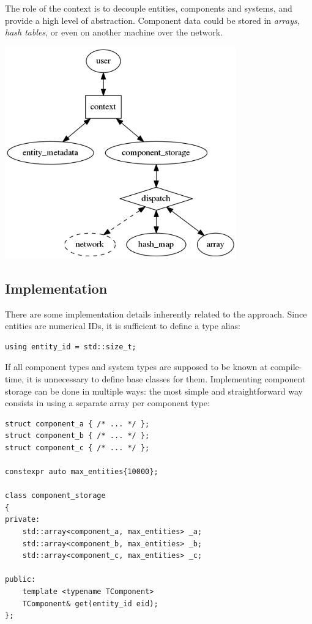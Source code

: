 \documentclass[oneside, 12pt, a4paper, openany]{book}
\let\origfigure=\figure
\let\endorigfigure=\endfigure
\renewenvironment{figure}[1][]{%
\origfigure[H]
}{%
\endorigfigure
}
\begin{document}
The role of the context is to decouple entities, components and systems,
and provide a high level of abstraction. Component data could be stored
in \emph{arrays}, \emph{hash tables}, or even on another machine over
the network.

\begin{figure}[htbp]
\centering
\includegraphics[width=0.75000\textwidth]{source/figures/generated/ecs/overview/dod_composition/context_role.png}
\caption{DOD: role of the context object}
\end{figure}

\subsection{Implementation}\label{implementation-2}

There are some implementation details inherently related to the
approach. Since entities are numerical IDs, it is sufficient to define a
type alias:

\begin{verbatim}
using entity_id = std::size_t;
\end{verbatim}

If all component types and system types are supposed to be known at
compile-time, it is unnecessary to define base classes for them.
Implementing component storage can be done in multiple ways: the most
simple and straightforward way consists in using a separate array per
component type:

\begin{verbatim}
struct component_a { /* ... */ };
struct component_b { /* ... */ };
struct component_c { /* ... */ };

constexpr auto max_entities{10000};

class component_storage
{
private:
    std::array<component_a, max_entities> _a;
    std::array<component_b, max_entities> _b;
    std::array<component_c, max_entities> _c;

public:
    template <typename TComponent>
    TComponent& get(entity_id eid);
};
\end{verbatim}
\end{document}
